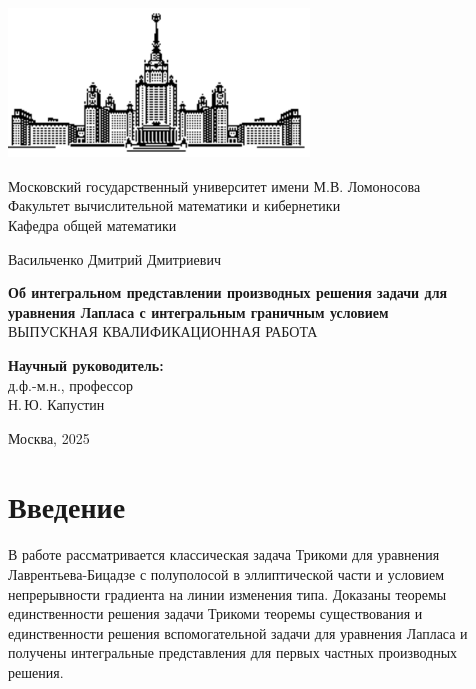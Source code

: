 \documentclass[12pt, a4paper]{article}
\begin{document}
\begin{titlepage}
\begin{center}
\includegraphics[width=8cm, height=4cm]{msu}
\end{center}
\begin{center}
Московский государственный университет имени М.В. Ломоносова\\
\vspace{0.1 cm}
Факультет вычислительной математики и кибернетики\\
\vspace{0.1 cm}
Кафедра общей математики

\vspace{3cm}
{\Large Васильченко Дмитрий Дмитриевич }\\
\vspace{1cm}

{\bf\LARGE Об интегральном представлении производных решения задачи для уравнения Лапласа с интегральным граничным условием}\\ \vspace{2cm}
ВЫПУСКНАЯ КВАЛИФИКАЦИОННАЯ РАБОТА

\end{center}
\vspace{2cm}
\begin{flushright}

{\bf Научный руководитель:}\\
д.ф.-м.н., профессор\\ 
Н.\,Ю. Капустин

\end{flushright}

 \vspace{2.0cm}

\centerline {Москва, 2025}

\end{titlepage}
\setcounter{page}{2}
\tableofcontents
\newpage
\section{Введение}
В работе рассматривается классическая задача Трикоми для уравнения Лаврентьева-Бицадзе с полуполосой в эллиптической части и условием непрерывности градиента на линии изменения типа. Доказаны теоремы единственности решения задачи Трикоми теоремы существования и единственности решения вспомогательной задачи для уравнения Лапласа и получены интегральные представления для первых частных производных решения.
\end{document}

